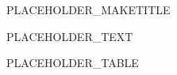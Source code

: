 \documentclass{article}
\begin{document}
{PLACEHOLDER_MAKETITLE}
\date{\today}
\maketitle

{PLACEHOLDER_TEXT}

{PLACEHOLDER_TABLE}
\end{document}
